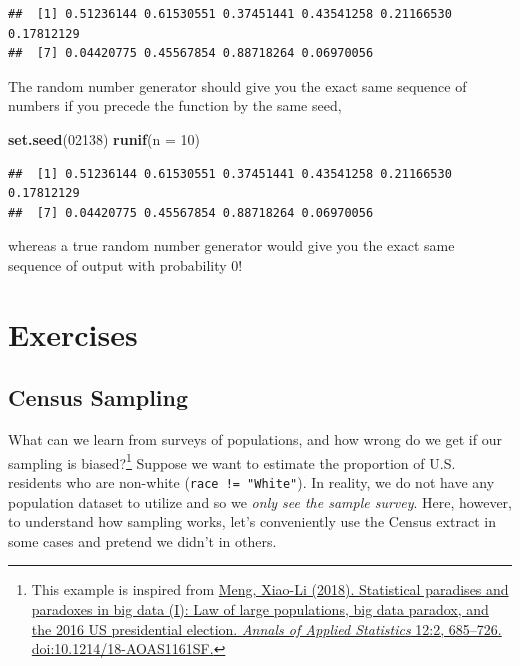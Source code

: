 \documentclass[]{book}
\newenvironment{Shaded}{\begin{snugshade}}{\end{snugshade}}
\newcommand{\DataTypeTok}[1]{\textcolor[rgb]{0.13,0.29,0.53}{#1}}
\newcommand{\DecValTok}[1]{\textcolor[rgb]{0.00,0.00,0.81}{#1}}
\newcommand{\KeywordTok}[1]{\textcolor[rgb]{0.13,0.29,0.53}{\textbf{#1}}}
\newcommand{\NormalTok}[1]{#1}
\let\rmarkdownfootnote\footnote%
\def\footnote{\protect\rmarkdownfootnote}
\theoremstyle{definition}
\theoremstyle{definition}
\theoremstyle{definition}
\theoremstyle{remark}
\begin{document}
\begin{Shaded}
\begin{Highlighting}[]
\begin{Shaded}
\begin{Highlighting}[]
\begin{Shaded}
\begin{Highlighting}[]
\begin{verbatim}
##  [1] 0.51236144 0.61530551 0.37451441 0.43541258 0.21166530 0.17812129
##  [7] 0.04420775 0.45567854 0.88718264 0.06970056
\end{verbatim}

The random number generator should give you the exact same sequence of numbers if you precede the function by the same seed,

\begin{Shaded}
\begin{Highlighting}[]
\KeywordTok{set.seed}\NormalTok{(}\DecValTok{02138}\NormalTok{)}
\KeywordTok{runif}\NormalTok{(}\DataTypeTok{n =} \DecValTok{10}\NormalTok{)}
\end{Highlighting}
\end{Shaded}

\begin{verbatim}
##  [1] 0.51236144 0.61530551 0.37451441 0.43541258 0.21166530 0.17812129
##  [7] 0.04420775 0.45567854 0.88718264 0.06970056
\end{verbatim}

whereas a true random number generator would give you the exact same sequence of output with probability 0!

\hypertarget{exercises-4}{%
\section*{Exercises}\label{exercises-4}}

\hypertarget{census-sampling}{%
\subsection*{Census Sampling}\label{census-sampling}}

What can we learn from surveys of populations, and how wrong do we get if our sampling is biased?\footnote{This example is inspired from \href{https://statistics.fas.harvard.edu/files/statistics-2/files/statistical_paradises_and_paradoxes.pdf}{Meng, Xiao-Li (2018). Statistical paradises and paradoxes in big data (I): Law of large populations, big data paradox, and the 2016 US presidential election. \emph{Annals of Applied Statistics} 12:2, 685--726. doi:10.1214/18-AOAS1161SF.}} Suppose we want to estimate the proportion of U.S. residents who are non-white (\texttt{race\ !=\ "White"}). In reality, we do not have any population dataset to utilize and so we \emph{only see the sample survey}. Here, however, to understand how sampling works, let's conveniently use the Census extract in some cases and pretend we didn't in others.


\end{Highlighting}
\end{Shaded}
\end{Highlighting}
\end{Shaded}
\end{Highlighting}
\end{Shaded}
\end{document}
